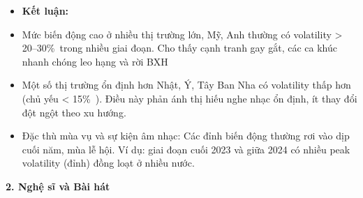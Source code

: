 \begin{itemize}
        \begin{itemize}
            \item \textbf{Kết luận: }
            \item Mức biến động cao ở nhiều thị trường lớn, Mỹ, Anh thường có volatility > 20–30\%\ trong nhiều giai đoạn. Cho thấy cạnh tranh gay gắt, các ca khúc nhanh chóng leo hạng và rời BXH
            \item Một số thị trường ổn định hơn Nhật, Ý, Tây Ban Nha có volatility thấp hơn (chủ yếu < 15\%\ ). Điều này phản ánh thị hiếu nghe nhạc ổn định, ít thay đổi đột ngột theo xu hướng.
            \item Đặc thù mùa vụ và sự kiện âm nhạc:
             Các đỉnh biến động thường rơi vào dịp cuối năm, mùa lễ hội.
               Ví dụ: giai đoạn cuối 2023 và giữa 2024 có nhiều peak volatility (đỉnh) đồng loạt ở nhiều nước.
        \end{itemize}

    

          
\end{itemize}


\textbf{2. Nghệ sĩ và Bài hát}


